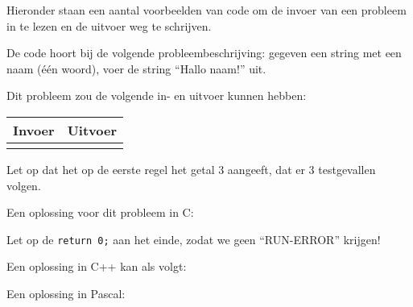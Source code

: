 \documentclass[11pt,titlepage,a4paper]{article}
\begin{document}
Hieronder staan een aantal voorbeelden van code om de invoer van een
probleem in te lezen en de uitvoer weg te schrijven.

De code hoort bij de volgende probleembeschrijving: gegeven een string
met een naam (\'e\'en woord), voer de string ``Hallo naam!'' uit.

Dit probleem zou de volgende in- en uitvoer kunnen hebben:

\begin{tabular}{|p{}|p{}|}
\hline
\textbf{Invoer} & \textbf{Uitvoer} \\
\hline
 &
 \\
\hline
\end{tabular}

Let op dat het op de eerste regel het getal 3 aangeeft, dat er 3
testgevallen volgen.

Een oplossing voor dit probleem in C:


Let op de \texttt{return 0;} aan het einde, zodat we geen
``RUN-ERROR'' krijgen!

Een oplossing in C++ kan als volgt:


Een oplossing in Pascal:

\end{document}
